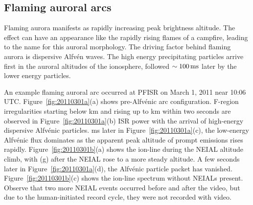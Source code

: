\subsection{Flaming auroral arcs}\label{sec:fusflame}
Flaming aurora manifests as rapidly increasing peak brightness altitude.
The effect can have an appearance like the rapidly rising flames of a campfire, leading to the name for this auroral morphology.
The driving factor behind flaming aurora is dispersive Alfvén waves.
The high energy precipitating particles arrive first in the auroral altitudes of the ionosphere, followed $\sim \unit[100]{ms}$ later by the lower energy particles.

An example flaming auroral arc occurred at PFISR on March 1, 2011 near 10:06 UTC.
Figure~\ref{fig:20110301a}(a) shows pre-Alfvénic arc configuration.
F-region irregularities starting below \unit[300]{km} and rising up to \unit[600]{km} within two seconds are observed in Figure~\ref{fig:20110301a}(b) ISR power with the arrival of high-energy dispersive Alfvénic particles.
\unit[400]{ms} later in Figure~\ref{fig:20110301a}(c), the low-energy Alfvénic flux dominates as the apparent peak altitude of prompt emissions rises rapidly.
Figure~\ref{fig:20110301b}(a) shows the ion-line during the NEIAL altitude climb, with (g) after the NEIAL rose to a more steady altitude.
A few seconds later in Figure~\ref{fig:20110301a}(d), the Alfvénic particle packet has vanished.
Figure~\ref{fig:20110301b}(c) shows the ion-line spectrum without NEIALs present.
Observe that two more NEIAL events occurred before and after the video, but due to the human-initiated record cycle, they were not recorded with video.
